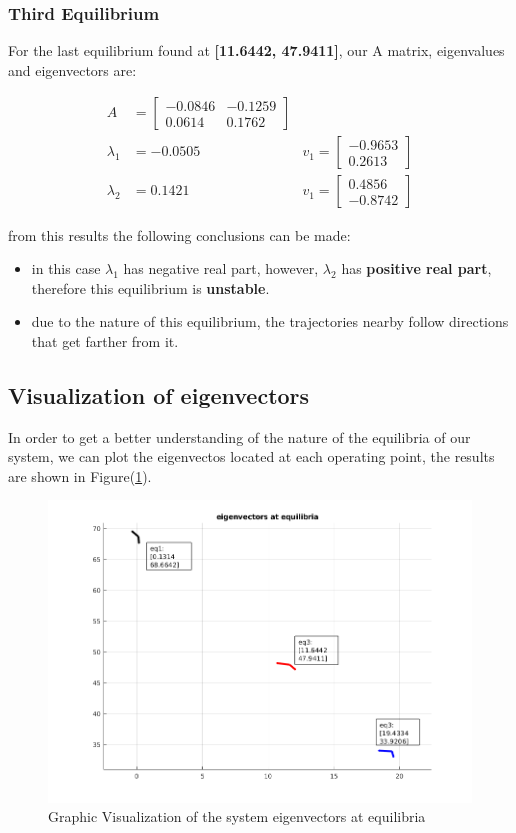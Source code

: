 \documentclass[12pt,letterpaper]{article}
\begin{document}
\subsubsection{Third Equilibrium}
For the last equilibrium found at \textbf{[11.6442, 47.9411]}, our A matrix, eigenvalues and eigenvectors are:

\begin{align}
    A &= \begin{bmatrix}
        -0.0846 & -0.1259 \\
        0.0614 & 0.1762
    \end{bmatrix} & \\
    \lambda_1 &= -0.0505 &v_1 = \begin{bmatrix}
        -0.9653 \\0.2613
    \end{bmatrix} \\ 
    \lambda_2 &= 0.1421 &v_1 = \begin{bmatrix}
        0.4856 \\-0.8742
    \end{bmatrix}
\end{align}

from this results the following conclusions can be made:
\begin{itemize}
    \item in this case $\lambda_1$ has negative real part, however, $\lambda_2$ has \textbf{positive real part}, therefore this equilibrium is \textbf{unstable}.
    \item due to the nature of this equilibrium, the trajectories nearby follow directions that get farther from it.
\end{itemize}

\subsection{Visualization of eigenvectors}
In order to get a better understanding of the nature of the equilibria of our system, we can plot the eigenvectos located at each operating point, 
the results are shown in Figure(\ref{fig:eigenvectors}).

\begin{figure}[!h] 
    \centering
    \includegraphics[width=1.1\textwidth]{../matlab/img/eigenvectors.png}
    \caption{Graphic Visualization of the system eigenvectors at equilibria}
    \label{fig:eigenvectors}
    \end{figure}
\end{document}
